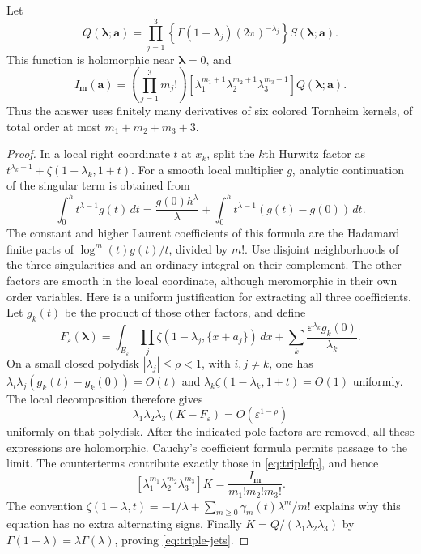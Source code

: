 \begin{theorem}
\label{thm:triple-jets}
Let
\begin{equation}\label{eq:Qtriple}
 Q(\boldsymbol\lambda;\boldsymbol a)
 =\prod_{j=1}^{3}\left\{\Gamma(1+\lambda_j)(2\pi)^{-\lambda_j}\right\}
       S(\boldsymbol\lambda;\boldsymbol a).
\end{equation}
This function is holomorphic near $\boldsymbol\lambda=0$, and
\begin{equation}\label{eq:triple-jets}
 \boxed{\quad
 I_{\boldsymbol m}(\boldsymbol a)
 =\left(\prod_{j=1}^{3}m_j!\right)
 [\lambda_1^{m_1+1}\lambda_2^{m_2+1}\lambda_3^{m_3+1}]
        Q(\boldsymbol\lambda;\boldsymbol a).
 \quad}
\end{equation}
Thus the answer uses finitely many derivatives of six colored Tornheim
kernels, of total order at most $m_1+m_2+m_3+3$.
\end{theorem}
\begin{proof}
In a local right coordinate $t$ at $x_k$, split the $k$th Hurwitz factor
as $t^{\lambda_k-1}+\zeta(1-\lambda_k,1+t)$.
For a smooth local multiplier $g$, analytic continuation of the singular
term is obtained from
\[
 \int_0^h t^{\lambda-1}g(t)\,dt
 =\frac{g(0)h^\lambda}{\lambda}
  +\int_0^h t^{\lambda-1}(g(t)-g(0))\,dt.
\]
The constant and higher Laurent coefficients of this formula are the
Hadamard finite parts of $\log^m(t)g(t)/t$, divided by $m!$.
Use disjoint neighborhoods of the three singularities and an ordinary
integral on their complement.  The other factors are smooth in the
local coordinate, although meromorphic in their own order variables.
Here is a uniform justification for extracting all three coefficients.
Let $g_k(t)$ be the product of those other factors, and define
\[
 F_\varepsilon(\boldsymbol\lambda)=
 \int_{E_\varepsilon}\prod_j\zeta(1-\lambda_j,\{x+a_j\})\,dx
 +\sum_k\frac{\varepsilon^{\lambda_k}g_k(0)}{\lambda_k}.
\]
On a small closed polydisk $|\lambda_j|\le\rho<1$, with $i,j\ne k$,
one has $\lambda_i\lambda_j(g_k(t)-g_k(0))=O(t)$ and
$\lambda_k\zeta(1-\lambda_k,1+t)=O(1)$ uniformly.  The local
decomposition therefore gives
\[
 \lambda_1\lambda_2\lambda_3(K-F_\varepsilon)
       =O(\varepsilon^{1-\rho})
\]
uniformly on that polydisk.  After the indicated pole factors are
removed, all these expressions are holomorphic.  Cauchy's coefficient
formula permits passage to the limit.  The counterterms contribute
exactly those in \eqref{eq:triplefp}, and hence
\[
 [\lambda_1^{m_1}\lambda_2^{m_2}\lambda_3^{m_3}]
 K=\frac{I_{\boldsymbol m}}{m_1!m_2!m_3!}.
\]
The convention $\zeta(1-\lambda,t)=-1/\lambda+
\sum_{m\ge0}\gamma_m(t)\lambda^m/m!$ explains why this equation has no
extra alternating signs.  Finally $K=Q/(\lambda_1\lambda_2\lambda_3)$
by $\Gamma(1+\lambda)=\lambda\Gamma(\lambda)$, proving
\eqref{eq:triple-jets}.
\end{proof}

